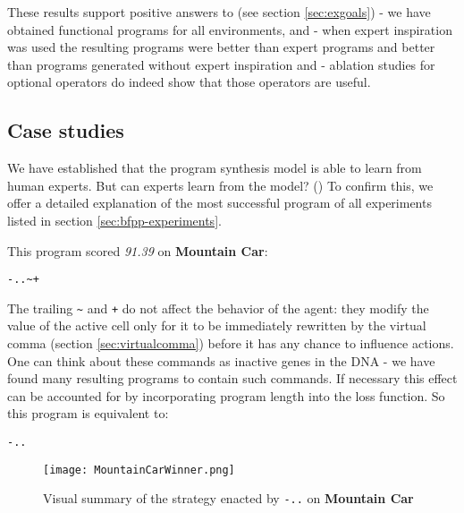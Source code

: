These results support positive answers to (see section \ref{sec:exgoals}) \rqbfpp - we have obtained functional programs for all environments, and \rqbfppexpert - when expert inspiration was used the resulting programs were better than expert programs and better than programs generated without expert inspiration and \rqbfppablation - ablation studies for optional operators do indeed show that those operators are useful.

\subsection{Case studies}
\label{sec:casestudies}

We have established that the program synthesis model is able to learn from human experts.
But can experts learn from the model? (\rqbfppexplainable) 
To confirm this, we offer a detailed explanation of the most successful program of all experiments listed in section \ref{sec:bfpp-experiments}.

This program scored \emph{91.39} on \textbf{Mountain Car}:

\begin{center}
\begin{lstlisting}
-..~+
\end{lstlisting}
\end{center}

The trailing \verb|~| and \verb|+| do not affect the behavior of the agent: they modify the value of the active cell only for it to be immediately rewritten by the virtual comma (section \ref{sec:virtualcomma}) before it has any chance to influence actions.
One can think about these commands as inactive genes in the DNA - we have found many resulting programs to contain such commands.
If necessary this effect can be accounted for by incorporating program length into the loss function.
So this program is equivalent to:

\begin{center}
\begin{lstlisting}
-..
\end{lstlisting}
\end{center}

\begin{figure}
    \centering
    \texttt{[image: MountainCarWinner.png]}
    \caption{Visual summary of the strategy enacted by \texttt{-..} on \textbf{Mountain Car}}
    \label{fig:mountaincarwinner}
\end{figure}

